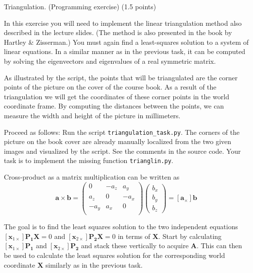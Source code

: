 \documentclass[12pt]{article} %
\newenvironment{exercise}[2][Task]{\begin{trivlist}
\item[\hskip \labelsep {\bfseries #1}\hskip \labelsep {\bfseries #2.}]}{\end{trivlist}}
\begin{document}
\vspace{2.5mm}

\begin{exercise}{3} Triangulation. (Programming exercise) (1.5 points)

\vspace{1mm}
\noindent In this exercise you will need to implement the linear triangulation method also described in the lecture slides.  (The method is also presented in the book by Hartley \& Zisserman.) You must again find a least-squares solution to a system of linear equations. In a similar manner as in the previous task, it can be computed by solving the eigenvectors and eigenvalues of a real symmetric matrix.

As illustrated by the script, the points that will be triangulated are the corner points of the picture on the cover of the course book. As a result of the triangulation we will get the coordinates of these corner points in the world coordinate frame. By computing the distances between the points, we can measure the width and height of the picture in millimeters.
\newline

\noindent Proceed as follows:
\newline
\noindent Run the script \texttt{triangulation\_task.py}.
 The corners of the picture on the book cover are already manually localized from the two given images and visualized by the script. See the comments in the source code.
 Your task is to implement the missing function \texttt{trianglin.py}.
\newline
 
\noindent Cross-product as a matrix multiplication can be written as
\begin{equation*}
\mathbf{a} \times \mathbf{b} = 
\begin{pmatrix}0 & -a_z & a_y\\
a_z & 0 & -a_x\\
-a_y & a_x & 0\\
\end{pmatrix}
\begin{pmatrix}b_x \\ b_y \\ b_z \end{pmatrix}
=[\mathbf{a}_\times]\mathbf{b}
\end{equation*}

\noindent The goal is to find the least squares solution to the two independent equations $[\mathbf{x}_{1\times}]\mathbf{P_1}\mathbf{X}=0$ and $[\mathbf{x}_{2\times}]\mathbf{P_2\mathbf{X}}=0$ in terms of $\mathbf{X}$. Start by calculating $[\mathbf{x}_{1\times}]\mathbf{P_1}$ and $[\mathbf{x}_{2\times}]\mathbf{P_2}$ and stack these vertically to acquire $\mathbf{A}$. This can then be used to calculate the least squares solution for the corresponding world coordinate $\mathbf{X}$ similarly as in the previous task.
\newline


\end{exercise}
\end{document}
